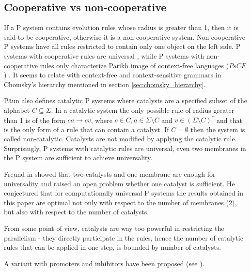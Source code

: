 \subsection{Cooperative vs non-cooperative} %
\label{sub:context_in_rules}


If a P system contains evolution rules whose radius is greater than 1, then it is said to be cooperative, otherwise it is a non-cooperative system. Non-cooperative P systems have all rules restricted to contain only one object on the left side.
P systems with cooperative rules are universal \cite{Paun98}, while P systems with non-cooperative rules only characterize Parikh image of context-free languages ($PsCF$) \cite{Sburlan05dragos}. It seems to relate with context-free and context-sensitive grammars in Chomsky's hierarchy mentioned in section \ref{sec:chomsky_hierarchy}. 


P\u{a}un \cite{Paun98} also defines catalytic P systems where catalysts are a specified subset of the alphabet $C\subseteq \Sigma$. In a catalytic system the only possible rule of radius greater than 1 is of the form $ca\rightarrow cv$, where $c\in C, a\in \Sigma\setminus C$ and $v\in (\Sigma\setminus C)^*$ and that is the only form of a rule that can contain a catalyst. If $C=\emptyset$ then the system is called non-catalytic. Catalysts are not modified by applying the catalytic rule. Surprisingly, P systems with catalytic rules are universal, even two membranes in the P system are sufficient to achieve universality.


Freund in \cite{Freund2005TwoCatalysts} showed that two catalysts and one membrane are enough for universality and raised an open problem whether one catalyst is sufficient. He conjectured that for computationally universal P systems the results obtained in this paper are optimal not only with respect to the number of membranes (2), but also with respect to the number of catalysts.


From some point of view, catalysts are way too powerful in restricting the parallelism - they directly participate in the rules, hence the number of catalytic rules that can be applied in one step, is bounded by number of catalysts.

A variant with promoters and inhibitors have been proposed (see \cite{Ionescu:jucs_10_5:on_p_systems_with}).

